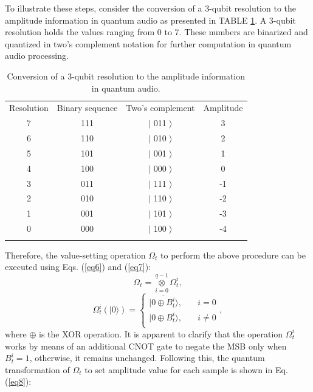 \documentclass[10pt,journal,compsoc]{IEEEtran}
\begin{document}
To illustrate these steps, consider the conversion of a 3-qubit resolution to the amplitude information in quantum audio as presented in TABLE \ref{tab1}. A 3-qubit resolution holds the values ranging from 0 to 7. These numbers are binarized and quantized in two's complement notation for further computation in quantum audio processing.

\begin{table}\label{tab1}
\caption{Conversion of a 3-qubit resolution to the amplitude information in quantum audio.}
\centering
\label{tab1}
\begin{tabular}{cccc}
\hline\noalign{\normalsize}
Resolution & Binary sequence & Two's complement & Amplitude\\
\noalign{\smallskip}\hline\noalign{\smallskip}
7 & 111 & $\vert$ 011 $\rangle$ & 3 \\
6 & 110 & $\vert$ 010 $\rangle$ & 2 \\
5 & 101 & $\vert$ 001 $\rangle$ & 1 \\
4 & 100 & $\vert$ 000 $\rangle$ & 0 \\
3 & 011 & $\vert$ 111 $\rangle$ & -1 \\
2 & 010 & $\vert$ 110 $\rangle$ & -2 \\
1 & 001 & $\vert$ 101 $\rangle$ & -3 \\
0 & 000 & $\vert$ 100 $\rangle$ & -4 \\
\noalign{\smallskip}\hline
\end{tabular}
\end{table}

Therefore, the value-setting operation $\Omega_{t}$ to perform the above procedure can be executed using Eqs. (\ref{eq6}) and (\ref{eq7}):
\begin{equation}\label{eq6}
\Omega_{t} = \mathop{\otimes} \limits_{i=0}^{q-1} \Omega^{i}_{t},
\end{equation}
\begin{equation}\label{eq7}
\Omega^{i}_{t} \left( \vert 0 \rangle \right) = \left \{ \begin{array}{ll}
\vert \overline{0 \oplus B_t^i} \rangle , & \quad i = 0\\
\vert 0 \oplus B_t^i \rangle  , & \quad i \neq 0\\
\end{array}\right.,
\end{equation}
where $\oplus$ is the XOR operation. It is apparent to clarify that the operation $\Omega^{i}_{t}$ works by means of an additional CNOT gate to negate the MSB only when $B_t^i = 1$, otherwise, it remains unchanged. Following this, the quantum transformation of $\Omega_{t}$ to set amplitude value for each sample is shown in Eq. (\ref{eq8}):
\end{document}
